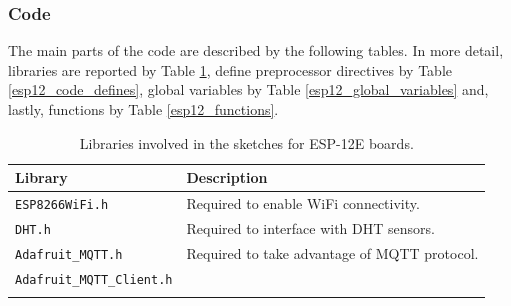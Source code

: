 \subsubsection{Code}
The main parts of the code are described by the following tables. In more detail, libraries are reported by Table \ref{esp12_code_libraries}, define preprocessor directives by Table \ref{esp12_code_defines}, global variables by Table \ref{esp12_global_variables} and, lastly, functions by Table \ref{esp12_functions}.

\noindent\begin{minipage}{\textwidth}
\begingroup
\setlength{\LTleft}{-20cm plus -1fill}
\setlength{\LTright}{\LTleft}
	\begin{longtable}{l | l}
		\hline
		\textbf{Library} & \textbf{Description} \\
		\hline
		\hline
		\texttt{ESP8266WiFi.h} & Required to enable WiFi connectivity. \\
		\hline
		\texttt{DHT.h} & Required to interface with DHT sensors. \\
		\hline
		\texttt{Adafruit\_MQTT.h} & Required to take advantage of MQTT protocol. \\ 
		\texttt{Adafruit\_MQTT\_Client.h} &  \\
		\hline

	\caption{Libraries involved in the sketches for ESP-12E boards.}
	\label{esp12_code_libraries}
	\end{longtable}
\endgroup
\end{minipage}

